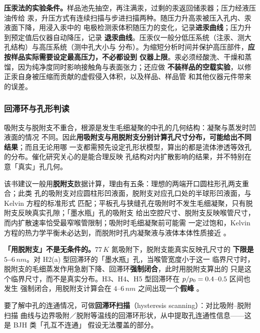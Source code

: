 \begin{measure}
\textbf{压汞法的实验条件。}样品池先抽空，再注满汞，过剩的汞返回储汞器；压力经液压油传给
汞，升压方式有连续扫描与步进扫描两种。随压力升高汞被压入孔内、汞液面下降，用浸入汞中的
电极检测汞体积随压力的变化，记录\textbf{进汞曲线}；压力升到预定值后仪器自动降压，记录
\textbf{退汞曲线}。压汞仪一般分低压系统（注汞、测大孔结构）与高压系统（测中孔大小与
分布）。为缩短分析时间并保护高压部件，\textbf{应按样品实际需要设定最高压力，不必都设到
仪器上限}。汞必须经酸洗、干燥和蒸馏，因为纯净度同时影响接触角与表面张力；还应做
\textbf{不装样品的空载实验}，以修正汞自身被压缩而贡献的虚假侵入体积，以及样品、样品管
和其他仪器元件带来的误差。
\end{measure}

\subsubsection{回滞环与孔形判读}

吸附支与脱附支不重合，根源是发生毛细凝聚的中孔的几何结构：凝聚与蒸发时凹液面的情况
不同。因此\textbf{用吸附支与用脱附支分别计算孔尺寸分布，可能给出不同结果}；而且无论用哪
一支都需预先设定孔形状模型，算出的都是流体渗透等效孔的分布。催化研究关心的是能合理反映
孔结构对内扩散影响的结果，并不特别在意「真实」孔几何。

该书建议一般用\textbf{脱附支}数据计算，理由有五条：理想的两端开口圆柱形孔两支重合；此类
孔的吸附支对应圆柱形凹液面，脱附支对应孔口处的半球形凹液面，与 Kelvin 方程的标准形式
匹配；平板孔与狭缝孔在吸附时不发生毛细凝聚，只有脱附支反映真实孔隙；「墨水瓶」孔的吸附支
给出空腔尺寸、脱附支反映喉管尺寸，而内扩散速率恰受最窄喉管限制；吸附时毛细凝聚前可能需
一定过饱和，Kelvin 方程的热力学平衡未必达到，而脱附时孔内凝聚液与液体本体性质接近
。

\begin{keycond}
\textbf{「用脱附支」不是无条件的。}$77\,\unit{K}$ 氮吸附下，脱附支能真实反映孔尺寸的
\textbf{下限是 $5$--$6\,\unit{nm}$}。对 H2(a) 型回滞环的「墨水瓶」孔，当喉管宽度小于这一
临界尺寸时，脱附支的毛细蒸发作用急剧下降、回滞环\textbf{强制闭合}，此时用脱附支算出的
只是这个临界尺寸，而不是真实分布。H3、H4、H5 型回滞环在 $p/p_{0}=0.4$--$0.5$ 区间也发生
强制闭合，用脱附支计算会在 $4$--$6\,\unit{nm}$ 之间出现一个\textbf{假峰}
。
\end{keycond}

要了解中孔的连通情况，可做\textbf{回滞环扫描}（hysteresis scanning）：对比吸附--脱附扫描
曲线与边界吸附／脱附等温线的回滞环形状，从中提取孔连通性信息——这是 BJH 类「孔互不连通」
假设无法覆盖的部分。

